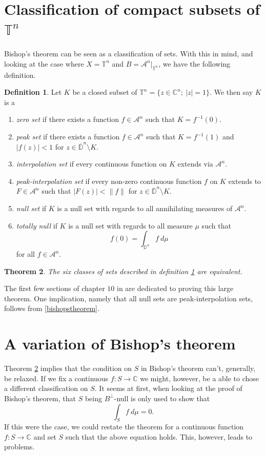 \documentclass[a4paper,12pt,twoside,BCOR=10mm]{scrbook}
\newtheorem{theorem}{Theorem}[section]
\theoremstyle{definition}
\theoremstyle{definition}
\theoremstyle{definition}
\newtheorem{definition}[theorem]{Definition}
\begin{document}
\section{Classification of compact subsets of $\mathbb{T}^n$}
\label{section4}
Bishop's theorem can be seen as a classification of sets.
With this in mind, and looking at the case where $X = \mathbb{T}^n$ and $B = \mathcal{A}^n|_{\mathbb{T}^n}$, we have the following definition.
\begin{definition}
\label{bigdef}
Let $K$ be a closed subset of $\mathbb{T}^n = \{z \in \mathbb{C}^n;\ |z| = 1\}$.
We then say $K$ is a
\begin{enumerate}
	\item \emph{zero set} if there exists a function $f \in \mathcal{A}^n$ such that $K = f^{-1}(0)$.
	\item \emph{peak set} if there exists a function $f \in \mathcal{A}^n$ such that $K = f^{-1}(1)$ and $|f(z)| < 1$ for $z \in \overline{\mathbb{D}}^n \setminus K$.
	\item \emph{interpolation set} if every continuous function on $K$ extends via $\mathcal{A}^n$. 
	\item \emph{peak-interpolation set} if every non-zero continuous function $f$ on $K$ extends to $F \in \mathcal{A}^n$ such that $|F(z)| < \|f\|$ for $z \in \overline{\mathbb{D}}^n \setminus K$.
	\item \emph{null set} if $K$ is a null set with regards to all annihilating measures of $\mathcal{A}^n$.
	\item \emph{totally null} if $K$ is a null set with regards to all measure $\mu$ such that
			\[
				f(0) = \int_{\mathbb{D}^n} f\ d\mu
			\]
			for all $f \in \mathcal{A}^n$.
\end{enumerate}
\end{definition}
\begin{theorem}
	\label{bigtheorem}
	The six classes of sets described in definition \ref{bigdef} are equivalent.
\end{theorem}
The first few sections of chapter $10$ in \citep{rudin3} are dedicated to proving this large theorem.
One implication, namely that all null sets are peak-interpolation sets, follows from \ref{bishopstheorem}.

\section{A variation of Bishop's theorem}
\label{section5}
Theorem \ref{bigtheorem} implies that the condition on $S$ in Bishop's theorem can't, generally, be relaxed.
If we fix a continuous $f: S \rightarrow \mathbb{C}$ we might, however, be a able to chose a different classification on $S$.
It seems at first, when looking at the proof of Bishop's theorem, that $S$ being $B^{\bot}$-null is only used to show that
\[
	\int_S f\ d\mu = 0.
\]
If this were the case, we could restate the theorem for a continuous function $f: S \rightarrow \mathbb{C}$ and set $S$ such that the above equation holds.
This, however, leads to problems.
\end{document}
